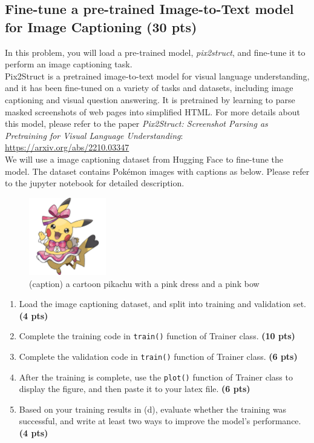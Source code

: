 \documentclass{assignment format}
\begin{document}
\subsection{Fine-tune a pre-trained Image-to-Text model for Image Captioning (30 pts)}
In this problem, you will load a pre-trained model, \textit{pix2struct}, and fine-tune it to perform an image captioning task.\\
Pix2Struct is a pretrained image-to-text model for visual language understanding, and it has been fine-tuned on a variety of tasks and datasets, including image captioning and visual question answering. It is pretrained by learning to parse masked screenshots of web pages into simplified HTML. For more details about this model, please refer to the paper \textit{Pix2Struct: Screenshot Parsing as Pretraining for Visual Language Understanding}: \url{https://arxiv.org/abs/2210.03347}\\
We will use a image captioning dataset from Hugging Face to fine-tune the model. The dataset contains Pokémon images with captions as below. Please refer to the jupyter notebook for detailed description.
\begin{figure}[h]
    \centering
    \includegraphics[width=0.3\textwidth]{pokemon.jpg}
    \caption{(caption) a cartoon pikachu with a pink dress and a pink bow}
    \label{fig:word2vec}
\end{figure}

\begin{enumerate}[label=(\alph*)]
    \item Load the image captioning dataset, and split into training and validation set. \textbf{(4 pts)}
    \item Complete the training code in \texttt{train()} function of Trainer class. \textbf{(10 pts)}
    \item Complete the validation code in \texttt{train()} function of Trainer class. \textbf{(6 pts)}
    \item After the training is complete, use the \texttt{plot()} function of Trainer class to display the figure, and then paste it to your latex file. \textbf{(6 pts)}
    \item Based on your training results in (d), evaluate whether the training was successful, and write at least two ways to improve the model's performance. \textbf{(4 pts)}
\end{enumerate}
\newpage
\end{document}

